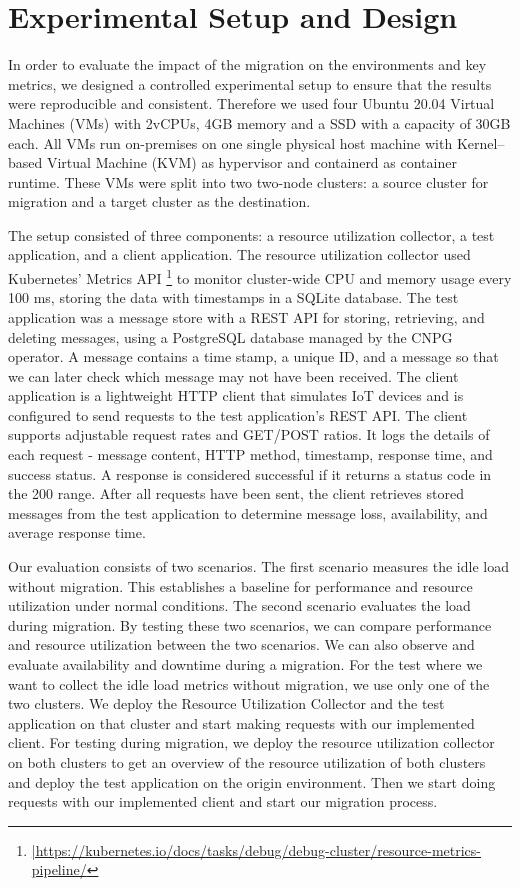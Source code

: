 %
\section{Experimental Setup and Design}
\label{sec:experimental_setup_and_design}

%
In order to evaluate the impact of the migration on the environments and key metrics, we designed a controlled experimental setup to ensure that the results were reproducible and consistent. Therefore we used four Ubuntu 20.04 Virtual Machines (VMs) with 2vCPUs, 4GB memory and a SSD with a capacity of 30GB each. All VMs run on-premises on one single physical host machine with Kernel–based Virtual Machine (KVM) as hypervisor and containerd as container runtime. These VMs were split into two two-node clusters: a source cluster for migration and a target cluster as the destination.

The setup consisted of three components: a resource utilization collector, a test application, and a client application. 
%
The resource utilization collector used Kubernetes' Metrics API \footnote{\url{|https://kubernetes.io/docs/tasks/debug/debug-cluster/resource-metrics-pipeline/}} to monitor cluster-wide CPU and memory usage every 100 ms, storing the data with timestamps in a SQLite database. 
%
The test application was a message store with a REST API for storing, retrieving, and deleting messages, using a PostgreSQL database managed by the CNPG operator. A message contains a time stamp, a unique ID, and a message so that we can later check which message may not have been received.
%
The client application is a lightweight HTTP client that simulates IoT devices and is configured to send requests to the test application's REST API. The client supports adjustable request rates and GET/POST ratios. It logs the details of each request - message content, HTTP method, timestamp, response time, and success status. A response is considered successful if it returns a status code in the 200 range. After all requests have been sent, the client retrieves stored messages from the test application to determine message loss, availability, and average response time.

Our evaluation consists of two scenarios. The first scenario measures the idle load without migration. This establishes a baseline for performance and resource utilization under normal conditions. The second scenario evaluates the load during migration. By testing these two scenarios, we can compare performance and resource utilization between the two scenarios. We can also observe and evaluate availability and downtime during a migration.
%
For the test where we want to collect the idle load metrics without migration, we use only one of the two clusters. We deploy the Resource Utilization Collector and the test application on that cluster and start making requests with our implemented client. For testing during migration, we deploy the resource utilization collector on both clusters to get an overview of the resource utilization of both clusters and deploy the test application on the origin environment. Then we start doing requests with our implemented client and start our migration process.